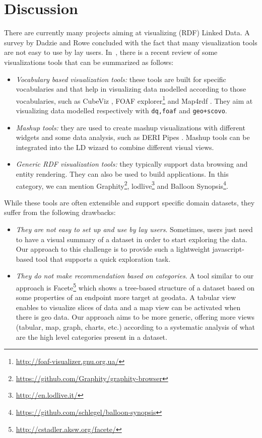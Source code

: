 \section{Discussion}
There are currently many projects aiming at visualizing (RDF) Linked Data. A survey by Dadzie and Rowe \cite{Dadzie:2011} concluded with the fact that many visualization tools are not easy to use by lay users. In~\cite{Klimek2014}, there is a recent review of some visualizations tools that can be summarized as follows:
\begin{itemize}
 \item \textit{Vocabulary based visualization tools:} these tools are built for specific vocabularies and that help in visualizing data modelled according to those vocabularies, such as CubeViz \cite{cubeviz:2012}, FOAF explorer\footnote{\url{http://foaf-visualizer.gnu.org.ua/}} and Map4rdf \cite{leon2012}. They aim at visualizing data modelled respectively with \texttt{dq,foaf} and \texttt{geo+scovo}.
 \item \textit{Mashup tools:} they are used to create mashup visualizations with different widgets and some data analysis, such as DERI Pipes \cite{danh2009}. Mashup tools can be integrated into the LD wizard to combine different visual views.  
 \item \textit{Generic RDF visualization tools:} they typically support data browsing and entity rendering. They can also be used to build applications. In this category, we can mention Graphity\footnote{\url{https://github.com/Graphity/graphity-browser}}, lodlive\footnote{\url{http://en.lodlive.it/}} and Balloon Synopsis\footnote{\url{https://github.com/schlegel/balloon-synopsis}}.
\end{itemize}
While these tools are often extensible and support specific domain datasets, they suffer from the following drawbacks:
\begin{itemize}
 \item \textit{They are not easy to set up and use by lay users}. Sometimes, users just need to have a visual summary of a dataset in order to start exploring the data. Our approach to this challenge is to provide such a lightweight javascript-based tool that supports a quick exploration task.
 \item \textit{They do not make recommendation based on categories}. A tool similar to our approach is Facete\footnote{\url{http://cstadler.aksw.org/facete/}}\cite{facete:2014} which shows a tree-based structure of a dataset based on some properties of an endpoint more target at geodata. A tabular view enables to visualize slices of data and a map view can be activated when there is geo data. Our approach aims to be more generic, offering more views (tabular, map, graph, charts, etc.) according to a systematic analysis of what are the high level categories present in a dataset.
\end{itemize}

